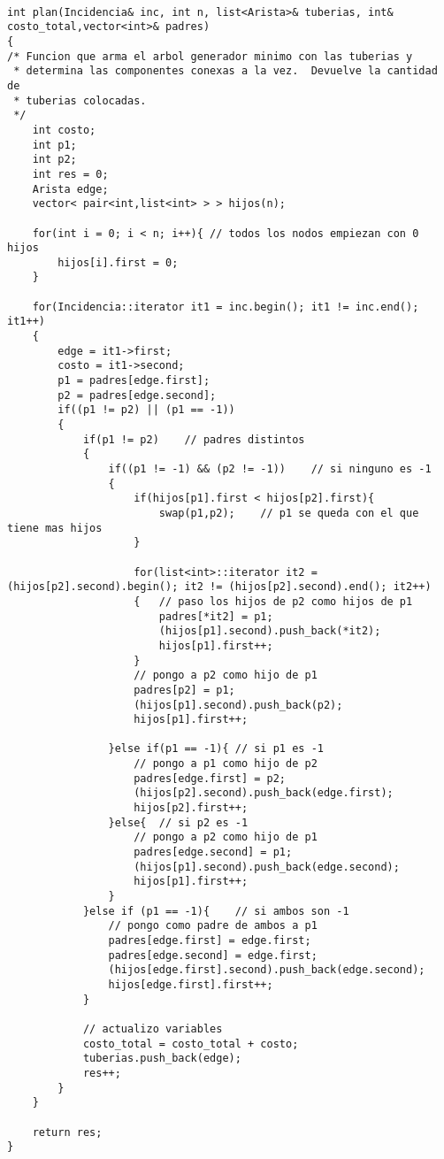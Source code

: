 \documentclass[a4paper]{article}
\begin{document}
\begin{lstlisting}

int plan(Incidencia& inc, int n, list<Arista>& tuberias, int& costo_total,vector<int>& padres)
{
/* Funcion que arma el arbol generador minimo con las tuberias y
 * determina las componentes conexas a la vez.  Devuelve la cantidad de
 * tuberias colocadas.
 */
	int costo;
	int p1;
	int p2;
	int res = 0;
	Arista edge;
	vector< pair<int,list<int> > > hijos(n);
	
	for(int i = 0; i < n; i++){	// todos los nodos empiezan con 0 hijos
		hijos[i].first = 0;
	}
	
	for(Incidencia::iterator it1 = inc.begin(); it1 != inc.end(); it1++)
	{
		edge = it1->first;
		costo = it1->second;
		p1 = padres[edge.first];
		p2 = padres[edge.second];
		if((p1 != p2) || (p1 == -1))
		{
			if(p1 != p2)	// padres distintos
			{
				if((p1 != -1) && (p2 != -1))	// si ninguno es -1
				{
					if(hijos[p1].first < hijos[p2].first){
						swap(p1,p2);	// p1 se queda con el que tiene mas hijos
					}
					
					for(list<int>::iterator it2 = (hijos[p2].second).begin(); it2 != (hijos[p2].second).end(); it2++)
					{	// paso los hijos de p2 como hijos de p1
						padres[*it2] = p1;
						(hijos[p1].second).push_back(*it2);
						hijos[p1].first++;
					}
					// pongo a p2 como hijo de p1
					padres[p2] = p1;
					(hijos[p1].second).push_back(p2);
					hijos[p1].first++;
					
				}else if(p1 == -1){	// si p1 es -1
					// pongo a p1 como hijo de p2
					padres[edge.first] = p2;
					(hijos[p2].second).push_back(edge.first);
					hijos[p2].first++;
				}else{	// si p2 es -1
					// pongo a p2 como hijo de p1
					padres[edge.second] = p1;
					(hijos[p1].second).push_back(edge.second);
					hijos[p1].first++;
				}
			}else if (p1 == -1){	// si ambos son -1
				// pongo como padre de ambos a p1
				padres[edge.first] = edge.first;
				padres[edge.second] = edge.first;
				(hijos[edge.first].second).push_back(edge.second);
				hijos[edge.first].first++;
			}
			
			// actualizo variables
			costo_total = costo_total + costo;
			tuberias.push_back(edge);
			res++;
		}
	}
	
	return res;
}
\end{lstlisting}


\vspace*{0.5cm}
\end{document}
